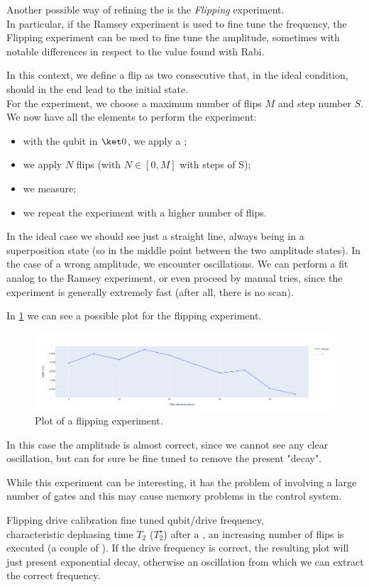 
Another possible way of refining the \pipulse is the \textit{Flipping} experiment.\\
In particular, if the Ramsey experiment is used to fine tune the frequency, the Flipping experiment can be used to fine tune the amplitude, sometimes with notable differences in respect to the value found with Rabi.

In this context, we define a flip as two consecutive \pipulses that, in the ideal condition, should in the end lead to the initial state.\\
For the experiment, we choose a maximum number of flips $M$ and step number $S$.
We now have all the elements to perform the experiment:
\begin{itemize}
    \item with the qubit in $\ket 0$, we apply a \pihpulse;
    \item we apply $N$ flips (with $N\in [0,M]$ with steps of S);
    \item we measure;
    \item we repeat the experiment with a higher number of flips.
\end{itemize}

In the ideal case we should see just a straight line, always being in a superposition state (so in the middle point between the two amplitude states).
In the case of a wrong amplitude, we encounter oscillations.
We can perform a fit analog to the Ramsey experiment, or even proceed by manual tries, since the experiment is generally extremely fast (after all, there is no scan). 

In \cref{fig:flipping} we can see a possible plot for the flipping experiment.
\begin{figure}[ht]
    \centering
    \includegraphics[width=\textwidth]{characterization/figures/flipping.png}
    \caption{Plot of a flipping experiment.}
    \label{fig:flipping}
\end{figure}
In this case the amplitude is almost correct, since we cannot see any clear oscillation, but can for sure be fine tuned to remove the present "decay".

While this experiment can be interesting, it has the problem of involving a large number of gates and this may  cause memory problems in the control system.

\experimentrecap
{Flipping}
{drive calibration}
{fine tuned qubit/drive frequency,\\characteristic dephasing time $T_2$ ($T_2^\star$)}
{after a \pihpulse, an increasing number of flips is executed (a couple of \pipulse). If the drive frequency is correct, the resulting plot will just present exponential decay, otherwise an oscillation from which we can extract the correct frequency.}






